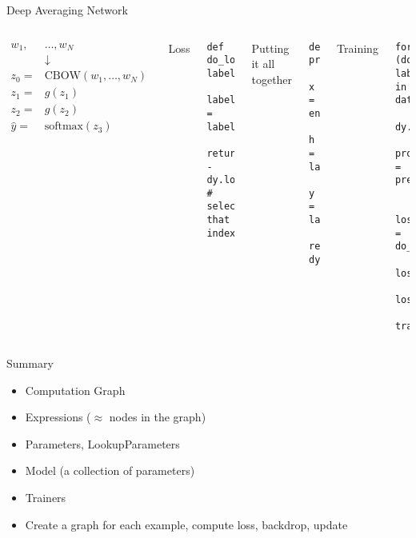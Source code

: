 \documentclass[compress]{beamer}
\begin{document}
\begin{frame}[fragile]{Deep Averaging Network}

\begin{columns}

  \begin{align*}
    w_1, &\dots, w_N \\
    & \downarrow \\
    z_0 = & \mbox{CBOW}(w_1, \dots, w_N) \\
    z_1 = & g(z_1) \\
    z_2 = & g(z_2) \\
    \hat y = & \mbox{softmax}(z_3)
  \end{align*}


\alert<1>{Loss}
\begin{verbatim}
def do_loss(probs, label):
    label = label_indicator[label]
    return -dy.log(dy.pick(probs,label)) # select that index
\end{verbatim}

\alert<2>{Putting it all together}
\begin{verbatim}
def predict_labels(doc):
    x = encode_doc(doc)
    h = layer1(x)
    y = layer2(h)
    return dy.softmax(y)
\end{verbatim}

\alert<3>{Training}
\begin{verbatim}
for (doc, label) in data:
    dy.renew_cg()
    probs = predict_labels(doc)

    loss = do_loss(probs,label)
    loss.forward()
    loss.backward()
    trainer.update()
\end{verbatim}

\end{columns}
\end{frame}


\begin{frame}{Summary}

\begin{itemize}
  \item Computation Graph
  \item Expressions ($\approx$ nodes in the graph)
  \item Parameters, LookupParameters
  \item Model (a collection of parameters)
  \item Trainers
  \item Create a graph for each example, compute loss, backdrop, update
\end{itemize}

\end{frame}
\end{document}
